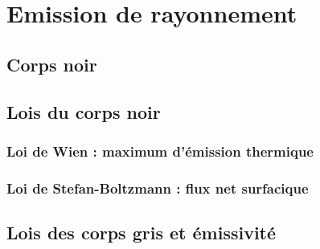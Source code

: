 \documentclass[a4paper,DIV16,10pt]{scrartcl}
\begin{document}
\mk \section{Emission de rayonnement} \label{corpsnoir}
		
	\sk \subsection{Corps noir}
		
		
		
	\sk \subsection{Lois du corps noir}
		\sk \subsubsection{Loi de Wien : maximum d'émission thermique}
		
		\sk \subsubsection{Loi de Stefan-Boltzmann : flux net surfacique}
		
	\sk \subsection{Lois des corps gris et émissivité}
		
		
%		
%		
%		
\end{document}
